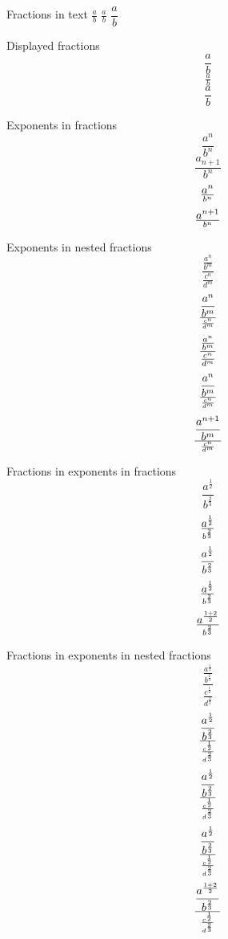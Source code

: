 \documentclass{article}
\begin{document}
Fractions in text
$\frac{a}{b}$
$\tfrac{a}{b}$
$\dfrac{a}{b}$

Displayed fractions
\[\frac{a}{b}\]
\[\tfrac{a}{b}\]
\[\dfrac{a}{b}\]

Exponents in fractions
\[ \frac{a^n}{b^n} \]
\[ \frac{a_{n+1}}{b^n} \]
\[ a^n \over b^n \]
\[ a^{n+1} \over b^n \]

Exponents in nested fractions
\[ \frac{\frac{a^n}{b^m}}{\frac{c^n}{d^m}} \]
\[ \frac{a^n}{b^m} \over \frac{c^n}{d^m} \]
\[ \frac{{a^n \over b^m}}{{c^n \over d^m}} \]
\[ {a^n \over b^m} \over {c^n \over d^m} \]
\[ {a^{n+1} \over b^m} \over {c^n \over d^m} \]

Fractions in exponents in fractions
\[ \frac{a^{\frac{1}{2}}}{b^{\frac{2}{3}}} \]
\[ a^{\frac{1}{2}} \over b^{\frac{2}{3}} \]
\[ \frac{a^{1 \over 2}}{b^{2 \over 3}} \]
\[ a^{1 \over 2} \over b^{2 \over 3} \]
\[ a^{{1+2} \over 2} \over b^{2 \over 3} \]

Fractions in exponents in nested fractions
\[ \frac{\frac{a^{\frac{1}{2}}}{b^{\frac{2}{3}}}}{\frac{c^{\frac{1}{2}}}{d^{\frac{2}{3}}}} \]
\[ \frac{a^{\frac{1}{2}}}{b^{\frac{2}{3}}} \over \frac{c^{\frac{1}{2}}}{d^{\frac{2}{3}}} \]
\[ {a^{\frac{1}{2}} \over b^{\frac{2}{3}}} \over {c^{\frac{1}{2}} \over d^{\frac{2}{3}}} \]
\[ {a^{1 \over 2} \over b^{2 \over 3}} \over {c^{1 \over 2} \over d^{2 \over 3}} \]
\[ {a^{{1+2} \over 2} \over b^{2 \over 3}} \over {c^{1 \over 2} \over d^{2 \over 3}} \]
\end{document}
